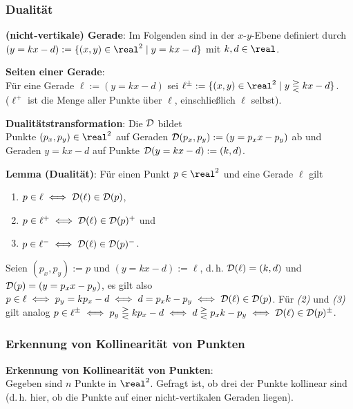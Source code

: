 \subsubsection{%
    Dualität%
}

\textbf{(nicht-vertikale) Gerade}:
Im Folgenden sind  in der $x$-$y$-Ebene definiert durch
$(y = kx - d) := \{(x, y) \in \real^2 \;|\; y = kx - d\}$ mit $k, d \in \real$.

\textbf{Seiten einer Gerade}:\\
Für eine Gerade $\ell := (y = kx - d)$ sei
$\ell^{\pm} := \{(x, y) \in \real^2 \;|\; y \gtreqless kx - d\}$.\\
($\ell^+$ ist die Menge aller Punkte über $\ell$, einschließlich $\ell$ selbst).

\textbf{Dualitätstransformation}:
Die  $\mathcal{D}$ bildet\\
Punkte $(p_x, p_y) \in \real^2$ auf Geraden $\mathcal{D}(p_x, p_y) := (y = p_x x - p_y)$ ab und\\
Geraden $y = kx - d$ auf Punkte $\mathcal{D}(y = kx - d) := (k, d)$.

\textbf{Lemma (Dualität)}:
Für einen Punkt $p \in \real^2$ und eine Gerade $\ell$ gilt
\begin{enumerate}
    \item
    $p \in \ell \iff \mathcal{D}(\ell) \in \mathcal{D}(p)$,

    \item
    $p \in \ell^+ \iff \mathcal{D}(\ell) \in \mathcal{D}(p)^+$ und

    \item
    $p \in \ell^- \iff \mathcal{D}(\ell) \in \mathcal{D}(p)^-$.
\end{enumerate}

\begin{Beweis}
    Seien $(p_x, p_y) := p$ und $(y = kx - d) := \ell$, d.\,h.
    $\mathcal{D}(\ell) = (k, d)$ und $\mathcal{D}(p) = (y = p_x x - p_y)$,
    es gilt also $p \in \ell \iff p_y = kp_x - d \iff d = p_x k - p_y \iff \mathcal{D}(\ell) \in \mathcal{D}(p)$.
    Für \emph{(2)} und \emph{(3)} gilt analog
    $p \in \ell^\pm \iff p_y \gtreqless kp_x - d \iff
    d \gtreqless p_x k - p_y \iff \mathcal{D}(\ell) \in \mathcal{D}(p)^\pm$.
\end{Beweis}

\subsubsection{%
    Erkennung von Kollinearität von Punkten%
}

\textbf{Erkennung von Kollinearität von Punkten}:\\
Gegeben sind $n$ Punkte in $\real^2$.
Gefragt ist, ob drei der Punkte kollinear sind\\
(d.\,h. hier, ob die Punkte auf einer nicht-vertikalen Geraden liegen).


